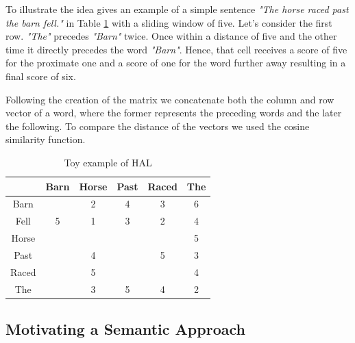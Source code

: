  To illustrate the idea \cite{burgess98} gives an example of a simple sentence \emph {"The horse raced past the barn fell."} in Table \ref{tab:halex} with a sliding window of five. Let's consider the first row.  \emph{"The"} precedes \emph{"Barn"} twice. Once within a distance of five and the other time it directly precedes the word  \emph{"Barn"}. Hence, that cell receives a score of five for the proximate one and a score of one for the word further away resulting in a final score of six. 

Following the creation of the matrix we concatenate both the column and row vector of a word, where the former represents the preceding words and the later the following. To compare the distance of the vectors we used the cosine similarity function. 


\begin{table}[H]
\centering
\begin{tabular}{ c c c c c c} \toprule
  & Barn & Horse &  Past & Raced & The \\ 
  \hline
 Barn &  & 2 &  4 & 3 & 6 \\ 
 Fell & 5 & 1 &  3 & 2 & 4 \\ 
 Horse &  &  &   &  & 5 \\ 
 Past &  & 4 &   & 5 & 3 \\ 
 Raced &  & 5 &   &  & 4 \\ 
 The &  & 3 &  5 & 4 & 2 \\ 
   \bottomrule
\end{tabular}
\caption{Toy example of HAL}
\label{tab:halex}
\end{table}





\subsection{Motivating a Semantic Approach}
\label{subsec:hal}

